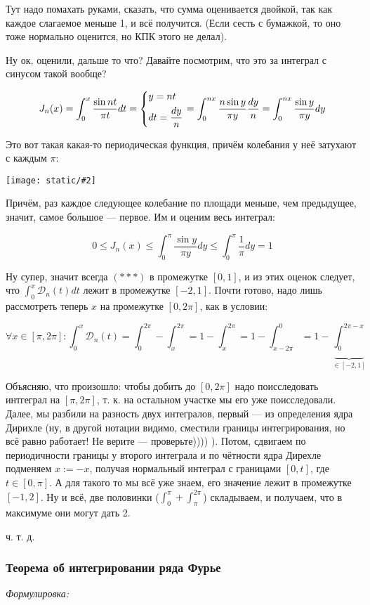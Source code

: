 \documentclass{article}
\def\images#1#2{\begin{center}\texttt{[image: static/\#2]}\end{center}}
\def\DD{\mathcal{D}}
\begin{document}
Тут надо помахать руками, сказать, что сумма оценивается двойкой, так как каждое слагаемое меньше 1, и всё получится. (Если сесть с бумажкой, то оно тоже нормально оценится, но КПК этого не делал).

Ну ок, оценили, дальше то что? Давайте посмотрим, что это за интеграл с синусом такой вообще?

\[J_n(x) = \int_{0}^{x} \frac{\sin nt}{\pi t} dt = \begin{dcases}
    y = nt \\
    dt = \frac{dy}{n}
\end{dcases} = \int_{0}^{nx} \frac{n \sin y}{\pi y} \frac{dy}{n} = \int_0^{nx} \frac{\sin y}{\pi y} dy\]

Это вот такая какая-то периодическая функция, причём колебания у неё затухают с каждым $\pi$:

\images{0.8}{lemm_sin.jpg}

Причём, раз каждое следующее колебание по площади меньше, чем предыдущее, значит, самое большое --- первое. Им и оценим весь интеграл:

\[0 \le J_n(x) \le \int_{0}^{\pi} \frac{\sin y}{\pi y} dy \le \int_{0}^{\pi} \frac{1}{\pi} dy = 1\]

Ну супер, значит всегда $(***)$ в промежутке $[0, 1]$, и из этих оценок следует, что $\int_0^x \DD_n(t)dt$ лежит в промежутке $[-2, 1]$. Почти готово, надо лишь рассмотреть теперь $x$ на промежутке $[0, 2\pi]$, как в условии:

\[\forall x \in [\pi, 2\pi] : \int_0^{x} \DD_n(t) = \int_0^{2\pi} - \int_x^{2\pi} = 1 -\int_x^{2\pi} = 1 - \int_{x  -2\pi}^{0} = 1 - \underbrace{\int_0^{2\pi - x}}_{\in [-2, 1]}\]

Объясняю, что произошло: чтобы добить до $[0, 2\pi]$ надо поисследовать интгеграл на $[\pi, 2\pi]$, т. к. на остальном участке мы его уже поисследовали. Далее, мы разбили на разность двух интегралов, первый --- из определения ядра Дирихле (ну, в другой нотации видимо, сместили границы интегрирования, но всё равно работает! Не верите --- проверьте)))) ). Потом, сдвигаем по периодичности границы у второго интеграла и по чётности ядра Дирехле подменяем $x := -x$, получая нормальный интеграл с границами $[0, t]$, где $t \in [0, \pi]$. А для такого то мы всё уже знаем, его значение лежит в промежутке $[-1, 2]$. Ну и всё, две половинки ($\int_0^{\pi} + \int_\pi^{2\pi}$) складываем, и получаем, что в максимуме они могут дать 2.

ч. т. д.

\subsubsection{Теорема об интегрировании ряда Фурье}
\textit{Формулировка:}
\end{document}

